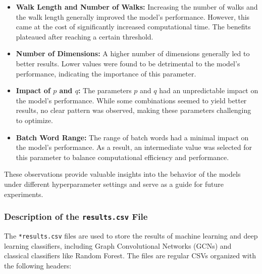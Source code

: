 \begin{itemize}
    \item \textbf{Walk Length and Number of Walks:} Increasing the number of walks and the walk length generally improved the model's performance. However, this came at the cost of significantly increased computational time. The benefits plateaued after reaching a certain threshold.
    
    \item \textbf{Number of Dimensions:} A higher number of dimensions generally led to better results. Lower values were found to be detrimental to the model's performance, indicating the importance of this parameter.
    
    \item \textbf{Impact of \( p \) and \( q \):} The parameters \( p \) and \( q \) had an unpredictable impact on the model's performance. While some combinations seemed to yield better results, no clear pattern was observed, making these parameters challenging to optimize.
    
    \item \textbf{Batch Word Range:} The range of batch words had a minimal impact on the model's performance. As a result, an intermediate value was selected for this parameter to balance computational efficiency and performance.
\end{itemize}

These observations provide valuable insights into the behavior of the models under different hyperparameter settings and serve as a guide for future experiments.

\subsubsection{Description of the \texttt{results.csv} File}

The \texttt{*results.csv} files are used to store the results of machine learning and deep learning classifiers, including Graph Convolutional Networks (GCNs) and classical classifiers like Random Forest. The files are regular CSVs organized with the following headers:

